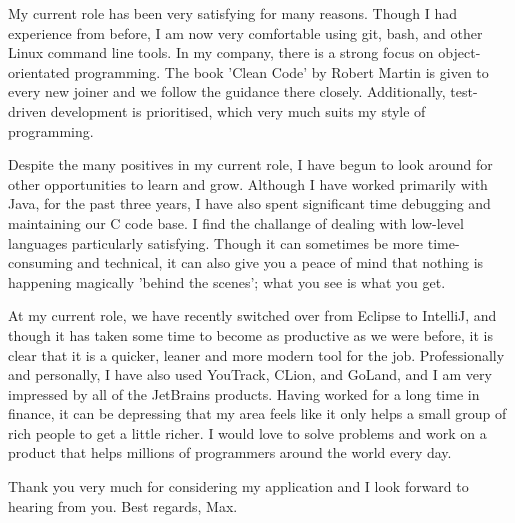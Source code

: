 \documentclass[11pt]{article}
\begin{document}
My current role has been very satisfying for many reasons. Though I had experience from before, I am now very comfortable using git, bash, and other Linux command line tools. In my company, there is a strong focus on object-orientated programming. The book 'Clean Code' by Robert Martin is given to every new joiner and we follow the guidance there closely. Additionally, test-driven development is prioritised, which very much suits my style of programming. 

Despite the many positives in my current role, I have begun to look around for other opportunities to learn and grow. Although I have worked primarily with Java, for the past three years, I have also spent significant time debugging and maintaining our C code base. I find the challange of dealing with low-level languages particularly satisfying. Though it can sometimes be more time-consuming and technical, it can also give you a peace of mind that nothing is happening magically 'behind the scenes'; what you see is what you get.

At my current role, we have recently switched over from Eclipse to IntelliJ, and though it has taken some time to become as productive as we were before, it is clear that it is a quicker, leaner and more modern tool for the job. Professionally and personally, I have also used YouTrack, CLion, and GoLand, and I am very impressed by all of the JetBrains products. Having worked for a long time in finance, it can be depressing that my area feels like it only helps a small group of rich people to get a little richer. I would love to solve problems and work on a product that helps millions of programmers around the world every day.

Thank you very much for considering my application and I look forward to hearing from you. Best regards, Max.

\end{document}
